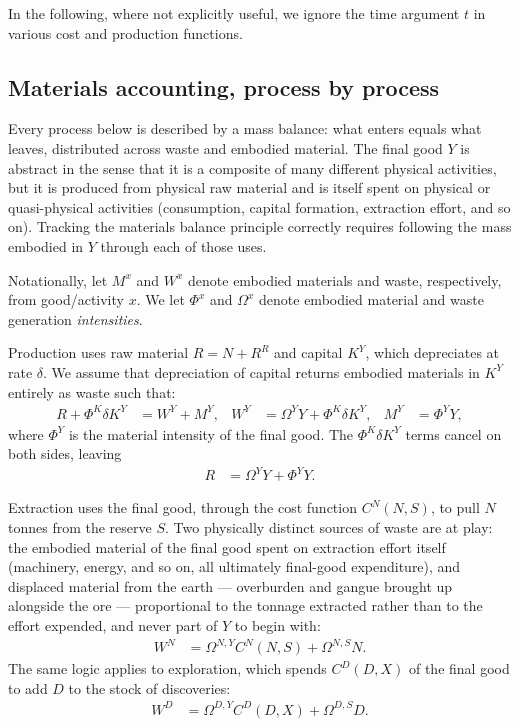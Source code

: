 \bigskip
In the following, where not explicitly useful, we ignore the time argument $t$ in various cost and production functions. 


\subsection{Materials accounting, process by process}
\label{sec:sp:setup:materialaccounting}
Every process below is described by a mass balance: what enters equals what leaves, distributed across waste and embodied material. The final good $Y$ is abstract in the sense that it is a composite of many different physical activities, but it is produced from physical raw material and is itself spent on physical or quasi-physical activities (consumption, capital formation, extraction effort, and so on). Tracking the materials balance principle correctly requires following the mass embodied in $Y$ through each of those uses.

Notationally, let $M^x$ and $W^x$ denote embodied materials and waste, respectively, from good/activity $x$. We let $\Phi^x$ and $\Omega^x$ denote embodied material and waste generation \emph{intensities}.

Production uses raw material $R=N+R^R$ and capital $K^Y$, which depreciates at rate $\delta$. We assume that depreciation of capital returns embodied materials in $K^Y$ entirely as waste such that:
\begin{align}
    R+\Phi^K\delta K^Y &= W^Y+M^Y, &
W^Y &= \Omega^YY+\Phi^K\delta K^Y, &
M^Y &= \Phi^YY,
\label{eq:sp:setup:production}
\end{align}
where $\Phi^Y$ is the material intensity of the final good. The $\Phi^K\delta K^Y$ terms cancel on both sides, leaving
\begin{align}
R &= \Omega^YY+\Phi^YY.
\label{eq:sp:setup:production-reduced}
\end{align}


 Extraction uses the final good, through the cost function $C^N(N,S)$, to pull $N$ tonnes from the reserve $S$. Two physically distinct sources of waste are at play: the embodied material of the final good spent on extraction effort itself (machinery, energy, and so on, all ultimately final-good expenditure), and displaced material from the earth --- overburden and gangue brought up alongside the ore --- proportional to the tonnage extracted rather than to the effort expended, and never part of $Y$ to begin with:
\begin{align}
W^N &= \Omega^{N,Y}C^N(N,S)+\Omega^{N,S}N.
\label{eq:sp:setup:extraction}
\end{align}
The same logic applies to exploration, which spends $C^D(D,X)$ of the final good to add $D$ to the stock of discoveries:
\begin{align}
W^D &= \Omega^{D,Y}C^D(D,X)+\Omega^{D,S}D.
\label{eq:sp:setup:exploration}
\end{align}

